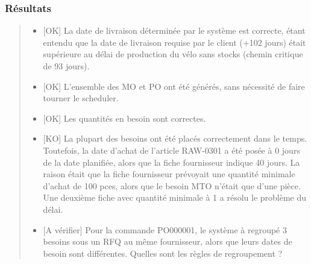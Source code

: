 \documentclass[letterpaper,10pt,french]{sphinxmanual}
\begin{document}
\subsubsection{Résultats}
\label{\detokenize{readthedocs/tests/C1_MPS:resultats}}\begin{quote}

\begin{itemize}
\item {} 
{[}OK{]} La date de livraison déterminée par le système est correcte, étant entendu que la date de livraison requise par le client (+102 jours) était supérieure au délai de production du vélo sans stocks (chemin critique de 93 jours).

\item {} 
{[}OK{]} L’ensemble des MO et PO ont été générés, sans nécessité de faire tourner le scheduler.

\item {} 
{[}OK{]} Les quantités en besoin sont correctes.

\item {} 
{[}KO{]} La plupart des besoins ont été placés correctement dans le temps. Toutefois, la date d’achat de l’article RAW-0301 a été posée à 0 jours de la date planifiée, alors que la fiche fournisseur indique 40 jours. La raison était que la fiche fournisseur prévoyait une quantité minimale d’achat de 100 pces, alors que le besoin MTO n’était que d’une pièce. Une deuxième fiche avec quantité minimale à 1 a résolu le problème du délai.

\item {} 
{[}A vérifier{]} Pour la commande PO000001, le système à regroupé 3 besoins sous un RFQ au même fournisseur, alors que leurs dates de besoin sont différentes. Quelles sont les règles de regroupement ?

\end{itemize}
\end{quote}
\end{document}
